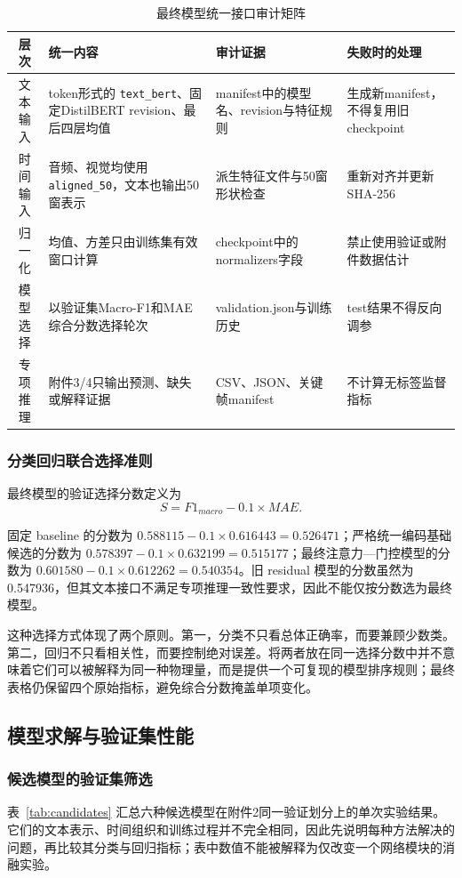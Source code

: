 \documentclass{gmcmthesis}
\newcommand{\code}[1]{\texttt{#1}}
\begin{document}
\begin{table}[H]
\centering
\caption{最终模型统一接口审计矩阵}
\label{tab:interface_audit}
\begin{tabularx}{0.98\textwidth}{cY Y Y}
\toprule
层次 & 统一内容 & 审计证据 & 失败时的处理 \\
\midrule
文本输入 & token形式的 \code{text\_bert}、固定DistilBERT revision、最后四层均值 & manifest中的模型名、revision与特征规则 & 生成新manifest，不得复用旧checkpoint \\
时间输入 & 音频、视觉均使用 \code{aligned\_50}，文本也输出50窗表示 & 派生特征文件与50窗形状检查 & 重新对齐并更新SHA-256 \\
归一化 & 均值、方差只由训练集有效窗口计算 & checkpoint中的normalizers字段 & 禁止使用验证或附件数据估计 \\
模型选择 & 以验证集Macro-F1和MAE综合分数选择轮次 & validation.json与训练历史 & test结果不得反向调参 \\
专项推理 & 附件3/4只输出预测、缺失或解释证据 & CSV、JSON、关键帧manifest & 不计算无标签监督指标 \\
\bottomrule
\end{tabularx}
\end{table}

\subsubsection{分类回归联合选择准则}
最终模型的验证选择分数定义为
\begin{equation}
S=F1_{macro}-0.1\times MAE.
\end{equation}
\par\indent 固定 baseline 的分数为 $0.588115-0.1\times0.616443=0.526471$；严格统一编码基础候选的分数为 $0.578397-0.1\times0.632199=0.515177$；最终注意力—门控模型的分数为 $0.601580-0.1\times0.612262=0.540354$。旧 residual 模型的分数虽然为0.547936，但其文本接口不满足专项推理一致性要求，因此不能仅按分数选为最终模型。

这种选择方式体现了两个原则。第一，分类不只看总体正确率，而要兼顾少数类。第二，回归不只看相关性，而要控制绝对误差。将两者放在同一选择分数中并不意味着它们可以被解释为同一种物理量，而是提供一个可复现的模型排序规则；最终表格仍保留四个原始指标，避免综合分数掩盖单项变化。

\subsection{模型求解与验证集性能}
\subsubsection{候选模型的验证集筛选}
表~\ref{tab:candidates} 汇总六种候选模型在附件2同一验证划分上的单次实验结果。它们的文本表示、时间组织和训练过程并不完全相同，因此先说明每种方法解决的问题，再比较其分类与回归指标；表中数值不能被解释为仅改变一个网络模块的消融实验。
\end{document}
